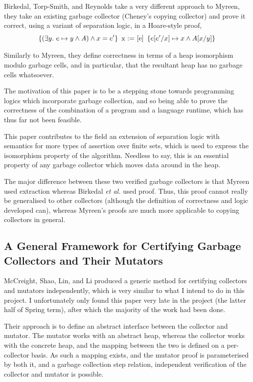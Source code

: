 Birkedal, Torp-Smith, and Reynolds\cite{Birkedal04} take a very
different approach to Myreen, they take an existing \gls{garbage
  collector} (Cheney's copying collector) and prove it correct, using
a variant of separation logic, in a Hoare-style
proof, \[\left\{(\exists y.\ e \mapsto y \land A) \land x = e'\right\}\ \mbox{x :=
[e]}\ \left\{e[e'/x] \mapsto x \land A[x/y]\right\}\]

Similarly to Myreen, they define correctness in terms of a heap
isomorphism modulo garbage cells, and in particular, that the
resultant heap has no garbage cells whatsoever.

The motivation of this paper is to be a stepping stone towards
programming logics which incorporate \gls{garbage collection}, and so
being able to prove the correctness of the combination of a program
and a language runtime, which has thus far not been feasible.

This paper contributes to the field an extension of separation logic
with semantics for more types of assertion over finite sets, which is
used to express the isomorphism property of the algorithm. Needless to
say, this is an essential property of any garbage collector which
moves data around in the heap.

The major difference between these two verified garbage collectors is
that Myreen used extraction whereas Birkedal \textit{et al.} used
proof. Thus, this proof cannot really be generalised to other
collectors (although the definition of correctness and logic developed
can), whereas Myreen's proofs are much more applicable to copying
collectors in general.

\subsection{A General Framework for Certifying Garbage Collectors and Their Mutators}
\label{sec:lit-verifying-mccreight}

McCreight, Shao, Lin, and Li\cite{McCreight07} produced a generic
method for certifying collectors and mutators independently, which is
very similar to what I intend to do in this project. I unfortunately
only found this paper very late in the project (the latter half of
Spring term), after which the majority of the work had been done.

Their approach is to define an abstract interface between the
collector and mutator. The mutator works with an abstract heap,
whereas the collector works with the concrete heap, and the mapping
between the two is defined on a per-collector basis. As such a mapping
exists, and the mutator proof is parameterised by both it, and a
garbage collection step relation, independent verification of the
collector and mutator is possible.

